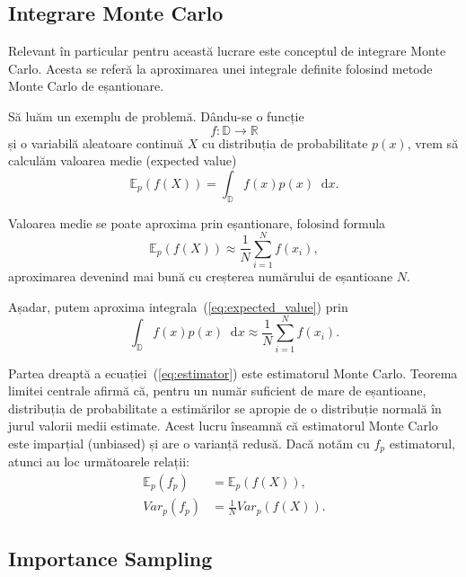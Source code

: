 \documentclass[12pt,a4paper]{report}
\newcommand*\diff{\mathop{}\!\mathrm{d}}
\numberwithin{equation}{section} %
\begin{document}
\subsection{Integrare Monte Carlo}

Relevant în particular pentru această lucrare este conceptul de integrare Monte Carlo.
Acesta se referă la aproximarea unei integrale definite folosind metode Monte Carlo
de eșantionare.

Să luăm un exemplu de problemă. Dându-se o funcție $$f: \mathbb{D} \to \mathbb{R}$$
și o variabilă aleatoare continuă $X$ cu distribuția de probabilitate $p(x)$, vrem să calculăm
valoarea medie (expected value)
\begin{equation}\label{eq:expected_value}
	\mathbb{E}_p(f(X)) = \int_{\mathbb{D}} f(x) p(x)\diff x.
\end{equation}

Valoarea medie se poate aproxima prin eșantionare, folosind formula
\begin{equation}
	\mathbb{E}_p(f(X)) \approx \frac{1}{N} \sum_{i=1}^{N} f(x_i),
\end{equation}
aproximarea devenind mai bună cu creșterea numărului de eșantioane $N$.

Așadar, putem aproxima integrala~(\ref{eq:expected_value}) prin
\begin{equation}\label{eq:estimator}
	\int_{\mathbb{D}} f(x) p(x)\diff x \approx \frac{1}{N} \sum_{i=1}^{N} f(x_i).
\end{equation}

Partea dreaptă a ecuației~(\ref{eq:estimator}) este estimatorul Monte Carlo.
Teorema limitei centrale afirmă că, pentru un număr suficient de mare de eșantioane,
distribuția de probabilitate a estimărilor se apropie de o distribuție normală în
jurul valorii medii estimate. Acest lucru înseamnă că estimatorul Monte
Carlo este imparțial (unbiased) și are o varianță redusă. Dacă notăm cu $f_p$
estimatorul, atunci au loc următoarele relații:
\begin{equation}
	\begin{aligned}
		\mathbb{E}_p(f_p) & = \mathbb{E}_p(f(X)),     \\
		Var_p(f_p)        & = \frac{1}{N}Var_p(f(X)).
	\end{aligned}
\end{equation}

\subsection{Importance Sampling}
\end{document}

